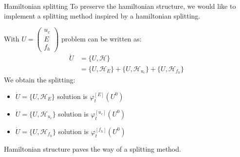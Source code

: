 \documentclass{beamer}
\newcommand{\arrow}{{\color{PLB}\ding{220}}}
\begin{document}
\begin{frame}{Hamiltonian splitting}
  To preserve the hamiltonian structure, we would like to implement a splitting method inspired by a hamiltonian splitting.

  With $U=\begin{pmatrix}u_c\\E\\f_h\end{pmatrix}$ problem can be written as:
  $$
    \begin{aligned}
      \dot{U} &= \{U,\mathcal{H}\} \\
              &= \{U,\mathcal{H}_{E}\} + \{U,\mathcal{H}_{u_c}\} + \{U,\mathcal{H}_{f_h}\}
    \end{aligned}
  $$
  We obtain the splitting:
  \begin{itemize}
    \item $\dot{U} = \{U,\mathcal{H}_{E}\}$   \hfill \arrow \hfill solution is $\varphi^{[E]}_t(U^0)$
    \item $\dot{U} = \{U,\mathcal{H}_{u_c}\}$ \hfill \arrow \hfill solution is $\varphi^{[u_c]}_t(U^0)$
    \item $\dot{U} = \{U,\mathcal{H}_{f_h}\}$ \hfill \arrow \hfill solution is $\varphi^{[f_h]}_t(U^0)$
  \end{itemize}
  Hamiltonian structure paves the way of a splitting method.
\end{frame}
\end{document}
